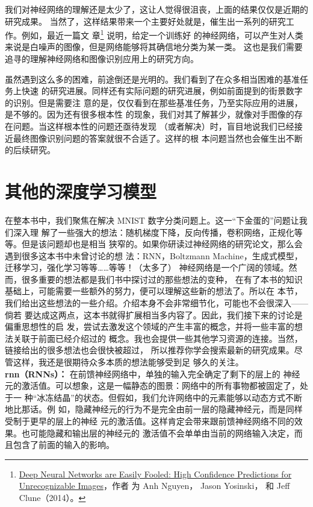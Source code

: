 我们对神经网络的理解还是太少了，这让人觉得很沮丧，上面的结果仅仅是近期的研究成果。
当然了，这样结果带来一个主要好处就是，催生出一系列的研究工作。例如，最近一篇文
章\footnote{\href{http://arxiv.org/abs/1412.1897}{Deep Neural Networks are
    Easily Fooled: High Confidence Predictions for Unrecognizable Images}，作者
  为 Anh Nguyen， Jason Yosinski， 和 Jeff Clune（2014）。} 说明，给定一个训练好
的神经网络，可以产生对人类来说是白噪声的图像，但是网络能够将其确信地分类为某一类。
这也是我们需要追寻的理解神经网络和图像识别应用上的研究方向。

虽然遇到这么多的困难，前途倒还是光明的。我们看到了在众多相当困难的基准任务上快速
的研究进展。同样还有实际问题的研究进展，例如前面提到的街景数字的识别。但是需要注
意的是，仅仅看到在那些基准任务，乃至实际应用的进展，是不够的。因为还有很多根本性
的现象，我们对其了解甚少，就像对手图像的存在问题。当这样根本性的问题还亟待发现
（或者解决）时，盲目地说我们已经接近最终图像识别问题的答案就很不合适了。这样的根
本问题当然也会催生出不断的后续研究。

\section{其他的深度学习模型}
\label{sec:other_approaches_to_deep_neural_nets}

在整本书中，我们聚焦在解决 MNIST 数字分类问题上。这一“下金蛋的”问题让我们深入理
解了一些强大的想法：随机梯度下降，反向传播，卷积网络，正规化等等。但是该问题却也是相当
狭窄的。如果你研读过神经网络的研究论文，那么会遇到很多这本书中未曾讨论的想
法：RNN，Boltzmann Machine，生成式模型，迁移学习，强化学习等等……等等！（太多了）
神经网络是一个广阔的领域。然而，很多重要的想法都是我们书中探讨过的那些想法的变种，
在有了本书的知识基础上，可能需要一些额外的努力，便可以理解这些新的想法了。所以在
本节，我们给出这些想法的一些介绍。介绍本身不会非常细节化，可能也不会很深入——倘若
要达成这两点，这本书就得扩展相当多内容了。因此，我们接下来的讨论是偏重思想性的启
发，尝试去激发这个领域的产生丰富的概念，并将一些丰富的想法关联于前面已经介绍过的
概念。我也会提供一些其他学习资源的连接。当然，链接给出的很多想法也会很快被超过，
所以推荐你学会搜索最新的研究成果。尽管这样，我还是很期待众多本质的想法能够受到足
够久的关注。\\

\textbf{\gls*{rnn}（RNNs）：} 在前馈神经网络中，单独的输入完全确定了剩下的层上的
神经元的激活值。可以想象，这是一幅静态的图景：网络中的所有事物都被固定了，处于一
种“冰冻结晶”的状态。但假如，我们允许网络中的元素能够以动态方式不断地比那话。例
如，隐藏神经元的行为不是完全由前一层的隐藏神经元，而是同样受制于更早的层上的神经
元的激活值。这样肯定会带来跟前馈神经网络不同的效果。也可能隐藏和输出层的神经元的
激活值不会单单由当前的网络输入决定，而且包含了前面的输入的影响。

